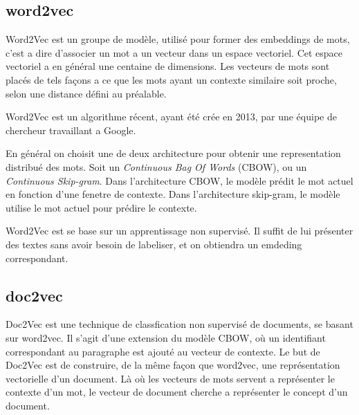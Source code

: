 \subsection{word2vec}
Word2Vec est un groupe de modèle, utilisé pour former des embeddings de mots, c'est a dire d'associer un mot a un vecteur dans un espace vectoriel. Cet espace vectoriel a en général une centaine de dimensions. Les vecteurs de mots sont placés de tels façons a ce que les mots ayant un contexte similaire soit proche, selon une distance défini au préalable.

Word2Vec est un algorithme récent, ayant été crée en 2013, par une équipe de chercheur travaillant a Google. 

En général on choisit une de deux architecture pour obtenir une representation distribué des mots. Soit un \textit{Continuous Bag Of Words} (CBOW), ou un \textit{Continuous Skip-gram}. Dans l'architecture CBOW, le modèle prédit le mot actuel en fonction d'une fenetre de contexte. Dans l'architecture skip-gram, le modèle utilise le mot actuel pour prédire le contexte. 

Word2Vec est se base sur un apprentissage non supervisé. Il suffit de lui présenter des textes sans avoir besoin de labeliser, et on obtiendra un emdeding correspondant.
\subsection{doc2vec}
Doc2Vec est une technique de classfication non supervisé de documents, se basant sur word2vec. Il s'agit d'une extension du modèle CBOW, où un identifiant correspondant au paragraphe est ajouté au vecteur de contexte. Le but de Doc2Vec est de construire, de la même façon que word2vec, une représentation vectorielle d'un document. Là où les vecteurs de mots servent a représenter le contexte d'un mot, le vecteur de document cherche a représenter le concept d'un document.

